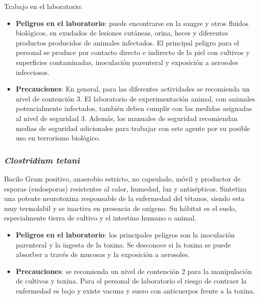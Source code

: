 Trabajo en el laboratorio:
\begin{itemize}[itemsep=0pt,parsep=0pt,topsep=0pt,partopsep=0pt]
    \item\textbf{Peligros en el laboratorio}: puede encontrarse en la sangre y otros fluidos biológicos, en exudados de lesiones cutáneas, orina, heces y diferentes productos producidos de animales infectados. El principal peligro para el personal se produce por contacto directo e indirecto de la piel con cultivos y superficies contaminadas, inoculación parenteral y exposición a aerosoles infecciosos.
    \item\textbf{Precauciones}: En general, para las diferentes actividades se recomienda un nivel de contención 3. El laboratorio de experimentación animal, con animales potencialmente infectados, también deben cumplir con las medidas asignadas al nivel de seguridad 3. Además, los manuales de seguridad recomiendan medias de seguridad adicionales para trabajar con este agente por su posible uso en terrorismo biológico.
\end{itemize}
\subsubsection{\textit{Clostridium tetani}}
Bacilo Gram positivo, anaerobio estricto, no capsulado, móvil y productor de esporas (endosporas) resistentes al calor, humedad, luz y antisépticos. Sintetiza una potente neurotoxina responsable de la enfermedad del tétanos, siendo esta muy termolabil y se inactiva en presencia de oxígeno. Su hábitat es el suelo, especialmente tierra de cultivo y el intestino humano o animal.
\begin{itemize}[itemsep=0pt,parsep=0pt,topsep=0pt,partopsep=0pt]
    \item\textbf{Peligros en el laboratorio}: los principales peligros son la inoculación parenteral y la ingesta de la toxina. Se desconoce si la toxina se puede absorber a través de mucosas y la exposición a aerosoles. 
    \item\textbf{Precauciones}: se recomienda un nivel de contención 2 para la manipulación de cultivos y toxina. Para el personal de laboratorio el riesgo de contraer la enfermedad es bajo y existe vacuna y suero con anticuerpos frente a la toxina.
\end{itemize}
